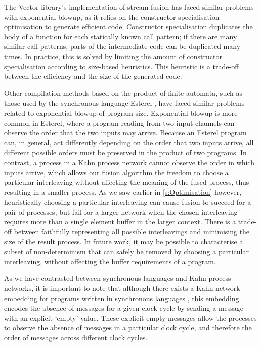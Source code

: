 The Vector library's implementation of stream fusion has faced similar problems with exponential blowup, as it relies on the constructor specialisation optimisation \citep{peyton2007call} to generate efficient code.
Constructor specialisation duplicates the body of a function for each statically known call pattern; if there are many similar call patterns, parts of the intermediate code can be duplicated many times.
In practice, this is solved by limiting the amount of constructor specialisation according to size-based heuristics.
This heuristic is a trade-off between the efficiency and the size of the generated code.

Other compilation methods based on the product of finite automata, such as those used by the synchronous language Esterel \citep{berry2000foundations}, have faced similar problems related to exponential blowup of program size.
Exponential blowup is more common in Esterel, where a program reading from two input channels can observe the order that the two inputs may arrive.
Because an Esterel program can, in general, act differently depending on the order that two inputs arrive, all different possible orders must be preserved in the product of two programs.
In contrast, a process in a Kahn process network cannot observe the order in which inputs arrive, which allows our fusion algorithm the freedom to choose a particular interleaving without affecting the meaning of the fused process, thus resulting in a smaller process.
As we saw earlier in \cref{s:Optimisation} however, heuristically choosing a particular interleaving can cause fusion to succeed for a pair of processes, but fail for a larger network when the chosen interleaving requires more than a single element buffer in the larger context.
There is a trade-off between faithfully representing all possible interleavings and minimising the size of the result process.
In future work, it may be possible to characterise a subset of non-determinism that can safely be removed by choosing a particular interleaving, without affecting the buffer requirements of a program.

As we have contrasted between synchronous languages and Kahn process networks, it is important to note that although there exists a Kahn network embedding for programs written in synchronous languages \citep{caspi1996synchronous}, this embedding encodes the absence of messages for a given clock cycle by sending a message with an explicit `empty' value.
These explicit empty messages allow the processes to observe the absence of messages in a particular clock cycle, and therefore the order of messages across different clock cycles.

